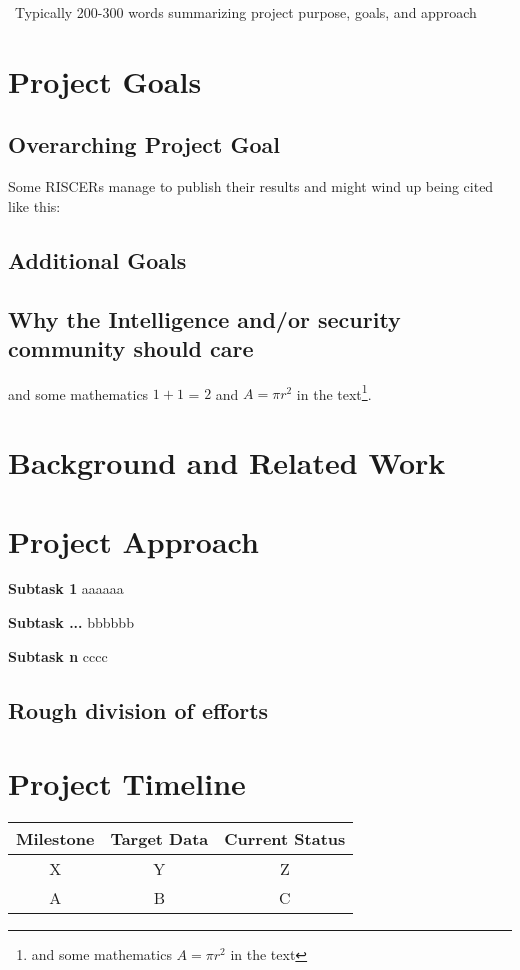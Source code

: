 \documentclass[letterpaper, 10pt]{article}
\begin{document}
\abstractname{~Typically 200-300 words summarizing project purpose, goals, and approach~}
\begin{multicols}{2}    
    \section{Project Goals}
        \subsection{Overarching Project Goal}
        Some RISCERs manage to publish their results and might wind up being cited like this: \cite{Joshi2022}
        \subsection{Additional Goals}
        \lipsum[2]
        \subsection{Why the Intelligence and/or security community should care}
        \lipsum[3]
        and some mathematics $1+1$ = $2$ and  $A=\pi r^2$ in the text\footnote{and some mathematics $A=\pi r^2$ in the text}.  
        
    \section{Background and Related Work}
        \lipsum[4]
    \section{Project Approach}
        \textbf{Subtask 1} aaaaaa
        
        \textbf{Subtask ...} bbbbbb
        
        \textbf{Subtask n} cccc

        \subsection{Rough division of efforts}
        
    \section{Project Timeline}
        \begin{center}
            \begin{tabular}{c|c|c}
                 Milestone  & Target Data   & Current Status  \\
                 \hline
                 X          & Y             & Z \\
                 A          & B             & C
            \end{tabular}
            \label{tab:my_label}
        \end{center}

\end{multicols}
\end{document}
